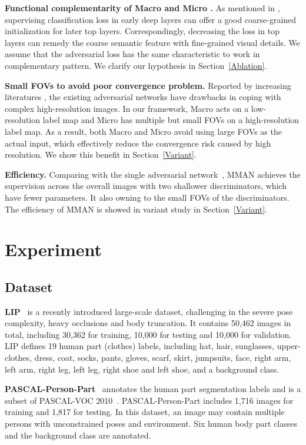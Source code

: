 \documentclass[runningheads]{llncs}
\begin{document}
\textbf{Functional complementarity of Macro  and Micro .} As mentioned in \cite{xue2017segan}, supervising classification loss in early deep layers can offer a good coarse-grained initialization for later top layers. Correspondingly, decreasing the loss in top layers can remedy the coarse semantic feature with fine-grained visual details. We assume that the adversarial loss has the same characteristic to work in complementary pattern. We clarify our hypothesis in Section~\ref{Ablation}.

\textbf{Small FOVs to avoid poor convergence problem.} Reported by increasing literatures \cite{denton2015pyramid,karras2017progressive}, the existing adversarial networks have drawbacks in coping with complex high-resolution images. In our framework, Macro  acts on a low-resolution label map and Micro  has multiple but small FOVs on a high-resolution label map. As a result, both Macro  and Micro  avoid using large FOVs as the actual input, which effectively reduce the convergence risk caused by high resolution. We show this benefit in Section~\ref{Variant}.

\textbf{Efficiency.} Comparing with the single adversarial network~\cite{luc2016semantic,dai2017scan}, MMAN achieves the supervision across the overall images with two shallower discriminators, which have fewer parameters. It also owning to the small FOVs of the discriminators. The efficiency of MMAN is showed in variant study in Section~\ref{Variant}.


\section{Experiment}

\subsection{Dataset}
\textbf{LIP}~\cite{gong2017look} is a recently introduced large-scale dataset, challenging in the severe pose complexity, heavy occlusions and body truncation. It contains 50,462 images in total, including 30,362 for training, 10,000 for testing and 10,000 for validation. LIP defines 19 human part (clothes) labels, including hat, hair, sunglasses, upper-clothes, dress, coat, socks, pants, gloves, scarf, skirt, jumpsuits, face, right arm, left arm, right leg, left leg, right shoe and left shoe, and  a background class.

\textbf{PASCAL-Person-Part}~\cite{chen2014detect} annotates the human part segmentation labels and is a subset of PASCAL-VOC 2010~\cite{pascal-voc-2010}. PASCAL-Person-Part includes 1,716 images for training and 1,817 for testing. In this dataset, an image may contain  multiple persons with unconstrained poses and environment. Six human body part classes and the background class are annotated.
\end{document}
